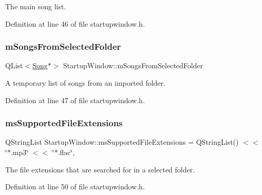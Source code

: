 The main song list. 



Definition at line 46 of file startupwindow.\+h.

\mbox{\label{class_startup_window_af419f4809f6fae0b370f1d9112dae9b4}} 
\subsubsection{\texorpdfstring{m\+Songs\+From\+Selected\+Folder}{mSongsFromSelectedFolder}}
{\footnotesize\ttfamily Q\+List$<$\mbox{\hyperlink{class_song}{Song}}$\ast$$>$ Startup\+Window\+::m\+Songs\+From\+Selected\+Folder\hspace{0.3cm}{\ttfamily [private]}}



A temporary list of songs from an imported folder. 



Definition at line 47 of file startupwindow.\+h.

\mbox{\label{class_startup_window_a7caf611224e692a7116cba45f1aa71a3}} 
\subsubsection{\texorpdfstring{ms\+Supported\+File\+Extensions}{msSupportedFileExtensions}}
{\footnotesize\ttfamily Q\+String\+List Startup\+Window\+::ms\+Supported\+File\+Extensions = Q\+String\+List() $<$$<$ \char`\"{}$\ast$.mp3\char`\"{} $<$$<$ \char`\"{}$\ast$.flac\char`\"{}\hspace{0.3cm}{\ttfamily [static]}, {\ttfamily [private]}}



The file extensions that are searched for in a selected folder. 



Definition at line 50 of file startupwindow.\+h.

\mbox{\label{class_startup_window_a5afeeaabe9a34a02a67d2e7d9f36dc09}} 
